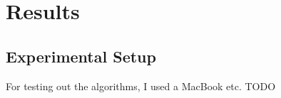\chapter{Results}
\section{Experimental Setup}
For testing out the algorithms, I used a MacBook etc. TODO